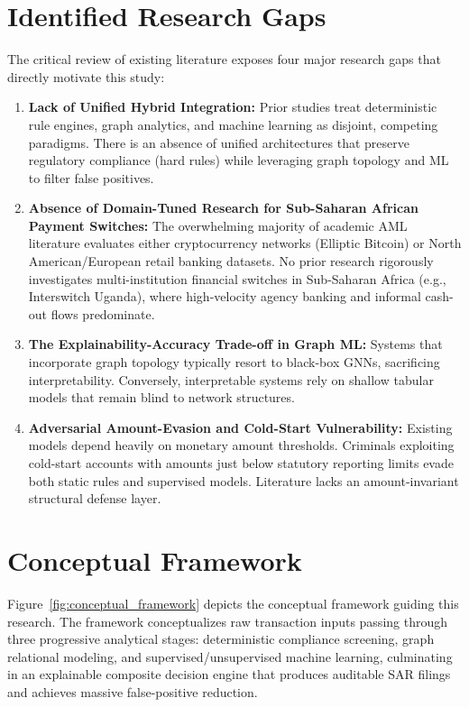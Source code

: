 \section{Identified Research Gaps}
The critical review of existing literature exposes four major research gaps that directly motivate this study:
\begin{enumerate}
    \item \textbf{Lack of Unified Hybrid Integration:} Prior studies treat deterministic rule engines, graph analytics, and machine learning as disjoint, competing paradigms. There is an absence of unified architectures that preserve regulatory compliance (hard rules) while leveraging graph topology and ML to filter false positives.
    \item \textbf{Absence of Domain-Tuned Research for Sub-Saharan African Payment Switches:} The overwhelming majority of academic AML literature evaluates either cryptocurrency networks (Elliptic Bitcoin) or North American/European retail banking datasets. No prior research rigorously investigates multi-institution financial switches in Sub-Saharan Africa (e.g., Interswitch Uganda), where high-velocity agency banking and informal cash-out flows predominate.
    \item \textbf{The Explainability-Accuracy Trade-off in Graph ML:} Systems that incorporate graph topology typically resort to black-box GNNs, sacrificing interpretability. Conversely, interpretable systems rely on shallow tabular models that remain blind to network structures.
    \item \textbf{Adversarial Amount-Evasion and Cold-Start Vulnerability:} Existing models depend heavily on monetary amount thresholds. Criminals exploiting cold-start accounts with amounts just below statutory reporting limits evade both static rules and supervised models. Literature lacks an amount-invariant structural defense layer.
\end{enumerate}

\section{Conceptual Framework}
Figure~\ref{fig:conceptual_framework} depicts the conceptual framework guiding this research. The framework conceptualizes raw transaction inputs passing through three progressive analytical stages: deterministic compliance screening, graph relational modeling, and supervised/unsupervised machine learning, culminating in an explainable composite decision engine that produces auditable SAR filings and achieves massive false-positive reduction.

